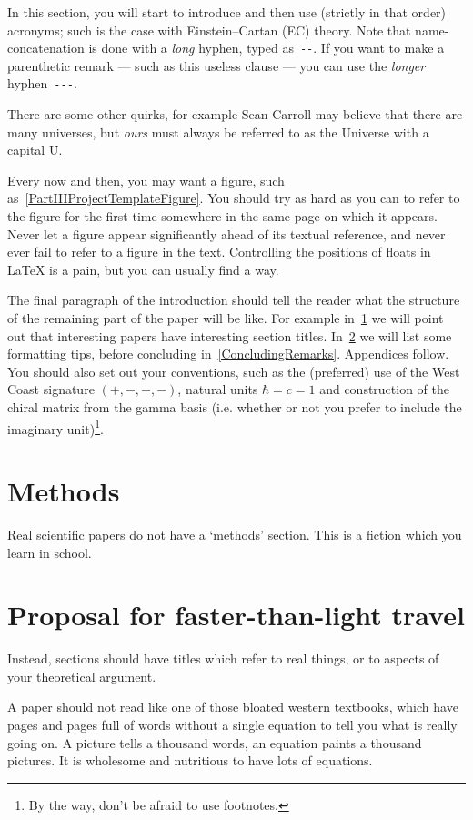 \documentclass[aps,prd,reprint,preprintnumbers,showpacs,floatfix,nofootinbib,superscript address]{revtex4-2}
\begin{document}
In this section, you will start to introduce and then use (strictly in that order) acronyms; such is the case with Einstein--Cartan (EC) theory. Note that name-concatenation is done with a \emph{long} hyphen, typed as~\texttt{-{-}}. If you want to make a parenthetic remark --- such as this useless clause --- you can use the \emph{longer} hyphen~\texttt{-{-}{-}}.

There are some other quirks, for example Sean Carroll may believe that there are many universes, but \emph{ours} must always be referred to as the Universe with a capital U.

Every now and then, you may want a figure, such as~\cref{PartIIIProjectTemplateFigure}. You should try as hard as you can to refer to the figure for the first time somewhere in the same page on which it appears. Never let a figure appear significantly ahead of its textual reference, and never ever fail to refer to a figure in the text. Controlling the positions of floats in \LaTeX{} is a pain, but you can usually find a way.

The final paragraph of the introduction should tell the reader what the structure of the remaining part of the paper will be like. For example in~\cref{Methods} we will point out that interesting papers have interesting section titles. In~\cref{FTL} we will list some formatting tips, before concluding in~\cref{ConcludingRemarks}. Appendices follow. You should also set out your conventions, such as the (preferred) use of the West Coast signature $(+,-,-,-)$, natural units $\hbar=c=1$ and construction of the chiral matrix from the gamma basis (i.e. whether or not you prefer to include the imaginary unit)\footnote{By the way, don't be afraid to use footnotes.}.

\section{Methods}\label{Methods}

Real scientific papers do not have a `methods' section. This is a fiction which you learn in school.

\section{Proposal for faster-than-light travel}\label{FTL}

Instead, sections should have titles which refer to real things, or to aspects of your theoretical argument.

A paper should not read like one of those bloated western textbooks, which have pages and pages full of words without a single equation to tell you what is really going on. A picture tells a thousand words, an equation paints a thousand pictures. It is wholesome and nutritious to have lots of equations.
\end{document}
